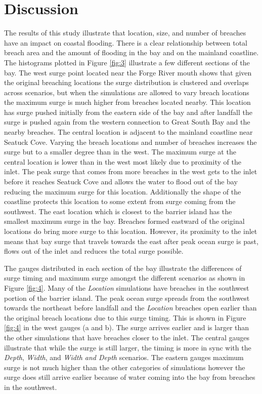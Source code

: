 \documentclass{coastal_paper}
\begin{document}
\section{Discussion}
The results of this study illustrate that location, size, and number of breaches have an impact on coastal flooding. There is a clear relationship between total breach area and the amount of flooding in the bay and on the mainland coastline. The histograms plotted in Figure \ref{fig:3} illustrate a few different sections of the bay. The west surge point located near the Forge River mouth shows that given the original breaching locations the surge distribution is clustered and overlaps across scenarios, but when the simulations are allowed to vary breach locations the maximum surge is much higher from breaches located nearby. This location has surge pushed initially from the eastern side of the bay and after landfall the surge is pushed again from the western connection to Great South Bay and the nearby breaches.
The central location is adjacent to the mainland coastline near Seatuck Cove. Varying the breach locations and number of breaches increases the surge but to a smaller degree than in the west. The maximum surge at the central location is lower than in the west most likely due to proximity of the inlet. The peak surge that comes from more breaches in the west gets to the inlet before it reaches Seatuck Cove and allows the water to flood out of the bay reducing the maximum surge for this location. Additionally the shape of the coastline protects this location to some extent from surge coming from the southwest. 
The east location which is closest to the barrier island has the smallest maximum surge in the bay. Breaches formed eastward of the original locations do bring more surge to this location. However, its proximity to the inlet means that bay surge that travels towards the east after peak ocean surge is past, flows out of the inlet and reduces the total surge possible.

The gauges distributed in each section of the bay illustrate the differences of surge timing and maximum surge amongst the different scenarios as shown in Figure \ref{fig:4}. Many of the \emph{Location} simulations have breaches in the southwest portion of the barrier island. The peak ocean surge spreads from the southwest towards the northeast before landfall and the \emph{Location} breaches open earlier than the original breach locations due to this surge timing. This is shown in Figure \ref{fig:4} in the west gauges (a and b). The surge arrives earlier and is larger than the other simulations that have breaches closer to the inlet. The central gauges illustrate that while the surge is still larger, the timing is more in sync with the \emph{Depth}, \emph{Width}, and \emph{Width and Depth} scenarios. The eastern gauges maximum surge is not much higher than the other categories of simulations however the surge does still arrive earlier because of water coming into the bay from breaches in the southwest.
\end{document}
